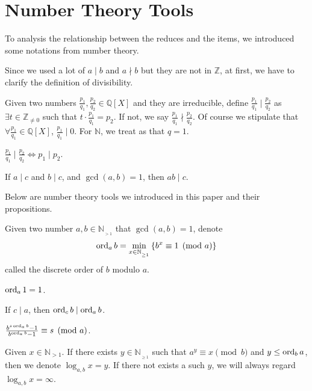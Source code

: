 \section{Number Theory Tools}\label{sec:number-theory-tools}
To analysis the relationship between the reduces and the items, we introduced some notations from number theory.

Since we used a lot of $a\mid b$ and $a\nmid b$ but they are not in $\mathbb{Z}$, at first, we have to clarify the definition of divisibility.
\begin{definition}\label{def:extend-divisibility}
Given two numbers $\frac{p_1}{q_1}, \frac{p_2}{q_2} \in \mathbb{Q}[X]$ and they are irreducible, define $\frac{p_1}{q_1}\mid \frac{p_2}{q_2}$ as $\exists t \in \mathbb{Z}_{\ne0}$ such that $t\cdot \frac{p_1}{q_1} = p_2$. If not, we say $\frac{p_1}{q_1}\nmid \frac{p_2}{q_2}$. Of course we stipulate that $\forall \frac{p_1}{q_1} \in \mathbb{Q}[X]$, $\frac{p_1}{q_1}\mid 0$. For $\mathbb{N}$, we treat as that $q = 1$.
\end{definition}
\begin{proposition}
    $\frac{p_1}{q_1}\mid \frac{p_2}{q_2} \Longleftrightarrow p_1\mid p_2$.
\end{proposition}
\begin{proposition}
    If $a \mid c$ and $b \mid c$, and $\gcd(a, b) = 1$, then $ ab \mid c$.
\end{proposition}
Below are number theory tools we introduced in this paper and their propositions.
\begin{definition}\label{def:order-under-modulo}
    Given two number $a, b\in \mathbb{N}_{_{>1}}$ that $\gcd(a, b) = 1$, denote
    \[\operatorname{ord}_{a}b = \min_{x \in \mathbb{N}_{_{\ge 1}}}\left\{b^{x} \equiv 1 \pmod{a} \right\}\]
    called the discrete order of $b$ modulo $a$.
\end{definition}
\begin{proposition}
    $\operatorname{ord}_{a}1 = 1$.
\end{proposition}
\begin{proposition}
    If $c \mid a$, then $\operatorname{ord}_{c}b \mid \operatorname{ord}_{a}b$.
\end{proposition}
\begin{proposition}\label{prop:power-order-mod}
    $\frac{b^{s\operatorname{ord}_{a} b} - 1}{b^{\operatorname{ord}_{a} b} - 1} \equiv s \pmod{a}$.
\end{proposition}
\begin{definition}\label{def:log-under-modulo}
Given $x\in \mathbb{N}_{>1}$.
If there exists $y \in \mathbb{N}_{_{\ge 1}}$ such that $a^y \equiv x \pmod{b}$ and $y \le \operatorname{ord}_{b}a$, then we denote $\log_{a, b}x = y$.
If there not exists a such $y$, we will always regard $\log_{a, b}x = \infty$.
\end{definition}
